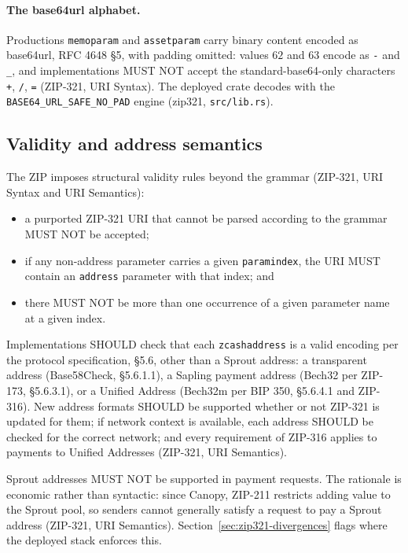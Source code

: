 \documentclass[11pt,a4paper]{article}
\theoremstyle{definition}
\begin{document}
\paragraph{The base64url alphabet.} Productions \texttt{memoparam} and
\texttt{assetparam} carry binary content encoded as base64url, RFC 4648
\S5, with padding omitted: values $62$ and $63$ encode as \texttt{-} and
\texttt{\_}, and implementations MUST NOT accept the standard-base64-only
characters \texttt{+}, \texttt{/}, \texttt{=} (ZIP-321, URI Syntax). The
deployed crate decodes with the \texttt{BASE64\_URL\_SAFE\_NO\_PAD} engine
(\textsf{zip321}, \texttt{src/lib.rs}).

\subsection{Validity and address semantics}\label{sec:zip321-validity}

The ZIP imposes structural validity rules beyond the grammar (ZIP-321, URI
Syntax and URI Semantics):
\begin{itemize}
\item a purported ZIP-321 URI that cannot be parsed according to the grammar
  MUST NOT be accepted;
\item if any non-address parameter carries a given \texttt{paramindex}, the
  URI MUST contain an \texttt{address} parameter with that index; and
\item there MUST NOT be more than one occurrence of a given parameter name
  at a given index.
\end{itemize}

Implementations SHOULD check that each \texttt{zcashaddress} is a valid
encoding per the protocol specification, \S5.6, other than a Sprout address:
a transparent address (Base58Check, \S5.6.1.1), a Sapling payment address
(Bech32 per ZIP-173, \S5.6.3.1), or a Unified Address (Bech32m per BIP 350,
\S5.6.4.1 and ZIP-316). New address formats SHOULD be supported whether or
not ZIP-321 is updated for them; if network context is available, each
address SHOULD be checked for the correct network; and every requirement of
ZIP-316 applies to payments to Unified Addresses (ZIP-321, URI Semantics).

Sprout addresses MUST NOT be supported in payment requests. The rationale is
economic rather than syntactic: since Canopy, ZIP-211 restricts adding value
to the Sprout pool, so senders cannot generally satisfy a request to pay a
Sprout address (ZIP-321, URI Semantics). Section~\ref{sec:zip321-divergences}
flags where the deployed stack enforces this.
\end{document}
